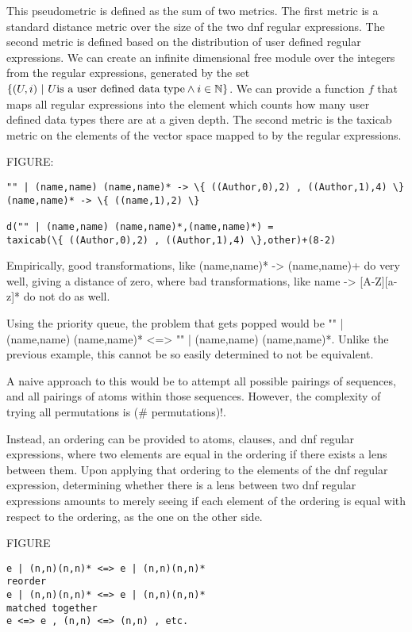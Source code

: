 This pseudometric is defined as the sum of two metrics.
The first metric is a standard distance metric over the size of the two dnf
regular expressions.
The second metric is defined based on the distribution of user defined regular
expressions.
We can create an infinite dimensional free module over the integers from the
regular expressions, generated by the set $\{(U,i)~|~ U\text{is a
user defined data type}\wedge i\in\mathbb{N}\}$.
We can provide a function $f$ that maps all regular expressions into the element
which counts how many user defined data types there are at a given depth.
The second metric is the taxicab metric on the elements of the vector space
mapped to by the regular expressions.

FIGURE:

\begin{lstlisting}
"" | (name,name) (name,name)* -> \{ ((Author,0),2) , ((Author,1),4) \}
(name,name)* -> \{ ((name,1),2) \}

d("" | (name,name) (name,name)*,(name,name)*) =
taxicab(\{ ((Author,0),2) , ((Author,1),4) \},other)+(8-2)
\end{lstlisting}

Empirically, good transformations, like (name,name)* -> (name,name)+
do very well, giving a distance of zero, where bad transformations, like
name -> [A-Z][a-z]* do not do as well.

Using the priority queue, the problem that gets popped would be
"" | (name,name) (name,name)* <=> "" | (name,name) (name,name)*.
Unlike the previous example, this cannot be so easily determined to not be
equivalent.

A naive approach to this would be to attempt all possible pairings of sequences,
and all pairings of atoms within those sequences.  However, the complexity of
trying all permutations is (\# permutations)!.

Instead, an ordering can be provided to atoms, clauses, and dnf regular
expressions, where two elements are equal in the ordering if there exists a lens
between them.  Upon applying that ordering to the elements of the dnf regular
expression, determining whether there is a lens between two dnf regular
expressions amounts to merely seeing if each element of the ordering is
equal with respect to the ordering, as the one on the other side.

FIGURE
\begin{lstlisting}
e | (n,n)(n,n)* <=> e | (n,n)(n,n)*
reorder
e | (n,n)(n,n)* <=> e | (n,n)(n,n)*
matched together
e <=> e , (n,n) <=> (n,n) , etc.
\end{lstlisting}

